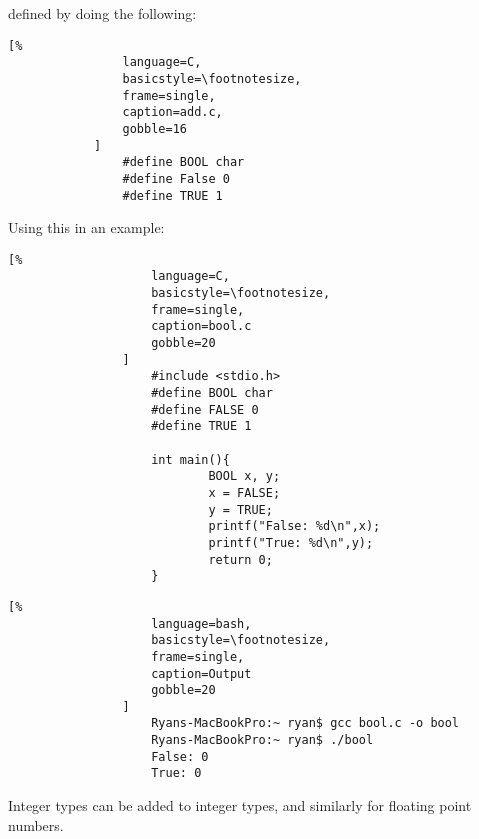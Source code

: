 \documentclass[crop=false,class=book]{standalone}
\begin{document}
            defined by doing the following:
            \newpage
            \begin{lstlisting}[%
                language=C,
                basicstyle=\footnotesize,
                frame=single,
                caption=add.c,
                gobble=16
            ]
                #define BOOL char
                #define False 0
                #define TRUE 1
            \end{lstlisting}
            Using this in an example:
            \newline
            \begin{minipage}[t]{.48\textwidth}
                \centering
                \begin{lstlisting}[%
                    language=C,
                    basicstyle=\footnotesize,
                    frame=single,
                    caption=bool.c
                    gobble=20
                ]
                    #include <stdio.h>
                    #define BOOL char
                    #define FALSE 0
                    #define TRUE 1
                    
                    int main(){
                            BOOL x, y;
                            x = FALSE;
                            y = TRUE;
                            printf("False: %d\n",x);
                            printf("True: %d\n",y);
                            return 0;
                    }
                \end{lstlisting}
            \end{minipage}\hfill
            \begin{minipage}[t]{.48\textwidth}
                \centering
                \begin{lstlisting}[%
                    language=bash,
                    basicstyle=\footnotesize,
                    frame=single,
                    caption=Output
                    gobble=20
                ]
                    Ryans-MacBookPro:~ ryan$ gcc bool.c -o bool
                    Ryans-MacBookPro:~ ryan$ ./bool
                    False: 0
                    True: 0
                \end{lstlisting}
            \end{minipage}
            Integer types can be added to integer types,
            and similarly for floating point numbers.\newline
\end{document}
